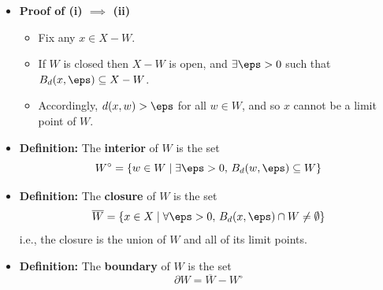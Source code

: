 \documentclass[11pt,twoside]{report}
\newcommand{\Interior}[1]{\ensuremath{{#1}^{\circ}}}
\newcommand{\Closure}[1]{\ensuremath{\overline{#1}}}
\begin{document}
\begin{itemize}
\begin{itemize}

\item \textbf{Proof of (i) $\implies$ (ii)}
\begin{itemize}
\item Fix any $x \in X - W$. 
\item If $W$ is closed then  $X - W$ is open, and  $\exists \eps > 0$ such that $B_d(x,\eps) \subseteq X - W$. 
\item Accordingly,   $d(x,w) > \eps$ for all $w \in W$, and so $x$  cannot be a limit point of $W$. 
\end{itemize}



\item \textbf{Definition:} The  \textbf{interior} of $W$ is the set 
\[
\Interior{W} = \{ w \in W \mid \exists \eps > 0, \, B_d(w, \eps) \subseteq W\} 
\]

\item \textbf{Definition:} The  \textbf{closure} of $W$ is the set 
\[
\Closure{W} = \{ x\in X \mid \forall \eps > 0, \,  B_d(x,\eps) \cap W \ne \emptyset \} 
\]
i.e., the closure is the union of $W$ and all of its limit points. 

\item \textbf{Definition:} The  \textbf{boundary} of $W$ is the set 
\[
\partial W = \Closure{W} - \Interior{W}
\]


%



\end{itemize}
\end{itemize}
\end{document}
